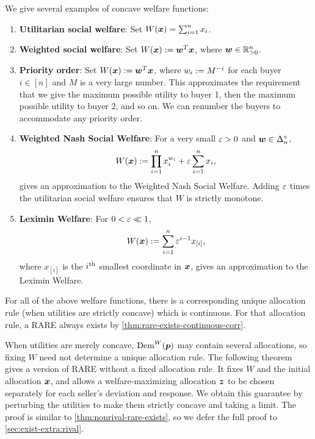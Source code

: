 We give several examples of concave welfare functions:
\begin{enumerate}
\item \textbf{Utilitarian social welfare}: Set $W(\bm{x}) = \sum_{i=1}^n x_i$.
\item \textbf{Weighted social welfare}: Set $W(\bm{x}) := \bm{w}^T\bm{x}$, where $\bm{w} \in \mathbb{R}_{>0}^n$.
\item \textbf{Priority order}:
    Set $W(\bm{x}) := \bm{w}^T\bm{x}$, where $w_i := M^{-i}$ for each buyer $i \in [n]$
    and $M$ is a very large number. This approximates the requirement that we give the maximum
    possible utility to buyer 1, then the maximum possible utility to buyer 2, and so on.
    We can renumber the buyers \wLoG{} to accommodate any priority order.
\item \textbf{Weighted Nash Social Welfare}: For a very small $\varepsilon > 0$ and $\bm{w} \in \Delta_n^{\circ}$,
    \[ W(\bm{x}) := \prod_{i=1}^n x_i^{w_i} + \varepsilon \sum_{i=1}^n x_i, \]
    gives an approximation to the Weighted Nash Social Welfare.
    Adding $\varepsilon$ times the utilitarian social welfare ensures that $W$ is strictly monotone.
\item \textbf{Leximin Welfare}: For $0 < \varepsilon \ll 1$,
    \[ W(\bm{x}) := \sum_{i=1}^n \varepsilon^{i-1} x_{[i]}, \]
    where $x_{[i]}$ is the $i^{\textrm{th}}$ smallest coordinate in $\bm{x}$,
    gives an approximation to the Leximin Welfare.
\end{enumerate}
For all of the above welfare functions, there is a corresponding unique allocation rule
(when utilities are strictly concave) which is continuous.
For that allocation rule, a RARE always exists by \cref{thm:rare-exists-continuous-corr}.

When utilities are merely concave, $\operatorname{Dem}^W(\bm{p})$ may contain several allocations,
so fixing $W$ need not determine a unique allocation rule.
The following theorem gives a version of RARE without a fixed allocation rule.
It fixes $W$ and the initial allocation $\bm{x}$, and allows a welfare-maximizing allocation $\bm{z}$
to be chosen separately for each seller's deviation and response.
We obtain this guarantee by perturbing the utilities to make them strictly concave and taking a limit.
The proof is similar to \cref{thm:nonrival-rare-exists},
so we defer the full proof to \cref{sec:exist-extra:rival}.

